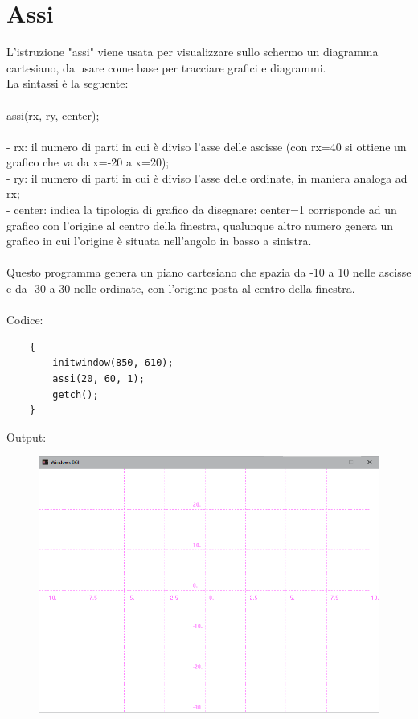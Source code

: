 \documentclass[12pt]{book}
\begin{document}
		\section{Assi}
			L'istruzione "assi" viene usata per visualizzare sullo schermo un diagramma cartesiano, da usare come base per tracciare grafici e diagrammi.
			\\La sintassi è la seguente:
			\\\\
			\Large assi(rx, ry, center);\\
			\normalsize
			\\- rx: il numero di parti in cui è diviso l'asse delle ascisse (con rx=40 si ottiene un grafico che va da 	x=-20 a x=20);
			\\- ry: il numero di parti in cui è diviso l'asse delle ordinate, in maniera analoga ad rx;
			\\- center: indica la tipologia di grafico da disegnare: center=1 corrisponde ad un grafico con l'origine al centro della finestra, qualunque altro numero genera un grafico in cui l'origine è situata nell'angolo in basso a sinistra.
			\\
			\\ Questo programma genera un piano cartesiano che spazia da -10 a 10 nelle ascisse e da -30 a 30 nelle ordinate, con l'origine posta al centro della finestra.
			\\ \\Codice:
			\begin{lstlisting}
	{
		initwindow(850, 610);	
		assi(20, 60, 1);	
		getch();
	}
			\end{lstlisting}
			\newpage
			Output:
			\begin{figure}[h]
				\includegraphics[scale=0.5]{assiterminale1}
			\end{figure}
		\newpage
	
\end{document}
